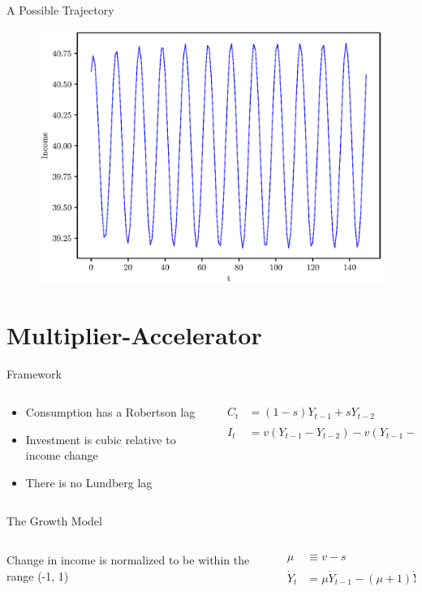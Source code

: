 \documentclass{beamer}
\begin{document}
\begin{frame}{A Possible Trajectory}
	\begin{figure}
		\centering
		\includegraphics[height=0.9\textheight]{timeseries_income.eps}
	\end{figure}
\end{frame}

\section*{Multiplier-Accelerator}
\begin{frame}{Framework}
	\begin{columns}
	\begin{column}{0.5\textwidth}
		\begin{itemize}
			\item Consumption has a Robertson lag
			\item Investment is cubic relative to income change
			\item There is no Lundberg lag
		\end{itemize}
	\end{column}
	\begin{column}{0.5\textwidth}
		\begin{align*}
			C_t &= (1-s)Y_{t-1} + sY_{t-2}\\
			I_t &= v(Y_{t-1}-Y_{t-2})-v(Y_{t-1}-Y_{t-2})^3
		\end{align*}
	\end{column}
	\end{columns}
\end{frame}
\begin{frame}{The Growth Model}
	\begin{columns}
	\begin{column}{0.5\textwidth}
		Change in income is normalized to be within the range (-1, 1)\autocite{Puu2003}
	\end{column}
	\begin{column}{0.5\textwidth}
		\begin{align*}
			\mu &\equiv v-s\\
			\dot Y_t &= \mu\dot Y_{t-1}-(\mu+1)\dot Y_{t-1}^3
		\end{align*}
	\end{column}
	\end{columns}
\end{frame}
\end{document}
